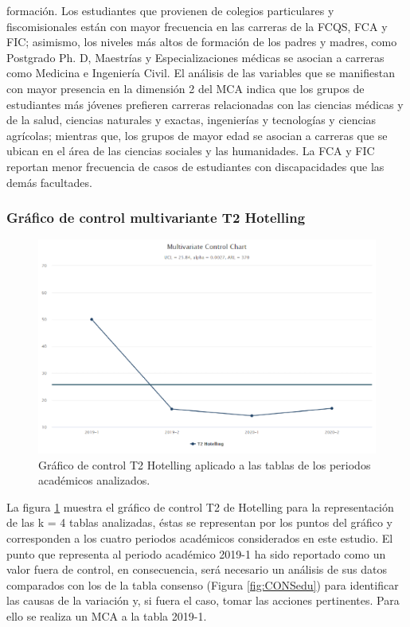 \documentclass[water,article,submit,moreauthors,pdftex]{mdpi}
\begin{document}
formación. Los estudiantes que provienen de colegios particulares y
fiscomisionales están con mayor frecuencia en las carreras de la FCQS,
FCA y FIC; asimismo, los niveles más altos de formación de los padres y
madres, como Postgrado Ph. D, Maestrías y Especializaciones médicas se
asocian a carreras como Medicina e Ingeniería Civil. El análisis de las
variables que se manifiestan con mayor presencia en la dimensión 2 del
MCA indica que los grupos de estudiantes más jóvenes prefieren carreras
relacionadas con las ciencias médicas y de la salud, ciencias naturales
y exactas, ingenierías y tecnologías y ciencias agrícolas; mientras que,
los grupos de mayor edad se asocian a carreras que se ubican en el área
de las ciencias sociales y las humanidades. La FCA y FIC reportan menor
frecuencia de casos de estudiantes con discapacidades que las demás
facultades.

\hypertarget{gruxe1fico-de-control-multivariante-t2-hotelling}{%
\subsubsection{Gráfico de control multivariante T2
Hotelling}\label{gruxe1fico-de-control-multivariante-t2-hotelling}}

\begin{figure}[!ht]



\begin{center}\includegraphics[width=0.6\linewidth,]{t2edu} \end{center}

\caption{Gráfico de control T2 Hotelling aplicado a las tablas de los periodos académicos analizados.}

\label{fig:t2edu}
\end{figure}

La figura \ref{fig:t2edu} muestra el gráfico de control T2 de Hotelling
para la representación de las k = 4 tablas analizadas, éstas se
representan por los puntos del gráfico y corresponden a los cuatro
periodos académicos considerados en este estudio. El punto que
representa al periodo académico 2019-1 ha sido reportado como un valor
fuera de control, en consecuencia, será necesario un análisis de sus
datos comparados con los de la tabla consenso (Figura \ref{fig:CONSedu})
para identificar las causas de la variación y, si fuera el caso, tomar
las acciones pertinentes. Para ello se realiza un MCA a la tabla 2019-1.
\end{document}

